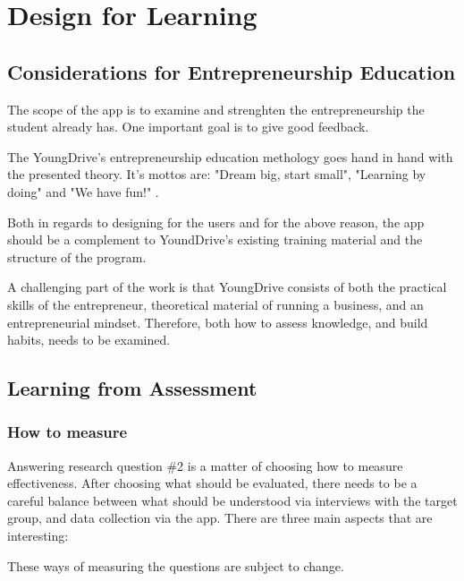 \section{Design for Learning}

\subsection{Considerations for Entrepreneurship Education}
The scope of the app is to examine and strenghten the entrepreneurship the student already has. One important goal is to give good feedback.

The YoungDrive's entrepreneurship education methology goes hand in hand with the presented theory. It's mottos are: "Dream big, start small", "Learning by doing" and "We have fun!" \cite{youngdrive}.

Both in regards to designing for the users and for the above reason, the app should be a complement to YoundDrive's existing training material and the structure of the program.

A challenging part of the work is that YoungDrive consists of both the practical skills of the entrepreneur, theoretical material of running a business, and an entrepreneurial mindset. Therefore, both how to assess knowledge, and build habits, needs to be examined.

\subsection{Learning from Assessment}

\subsubsection{How to measure}

Answering research question \#2 is a matter of choosing how to measure effectiveness. After choosing what should be evaluated, there needs to be a careful balance between what should be understood via interviews with the target group, and data collection via the app. There are three main aspects that are interesting:

These ways of measuring the questions are subject to change.


